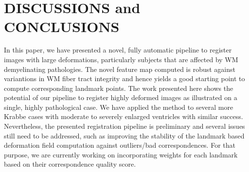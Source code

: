 \documentclass{llncs}
\begin{document}
\section{DISCUSSIONS and CONCLUSIONS}
In this paper, we have presented a novel, fully automatic pipeline to register images with large deformations, particularly subjects that are affected by WM demyelinating pathologies. The novel feature map computed is robust against variantions in WM fiber tract integrity and hence yields a good starting point to compute corresponding landmark points. The work presented here shows the potential of our pipeline to register highly deformed images as illustrated on a single, highly pathological case. We have applied the method to several more Krabbe cases with moderate to severely enlarged ventricles with similar success. Nevertheless, the presented registration pipeline is preliminary and several issues still need to be addressed, such as improving the stability of the landmark based deformation field computation against outliers/bad correspondences. For that purpose, we are currently working on incorporating weights for each landmark based on their correspondence quality score.

%
%


\end{document}
